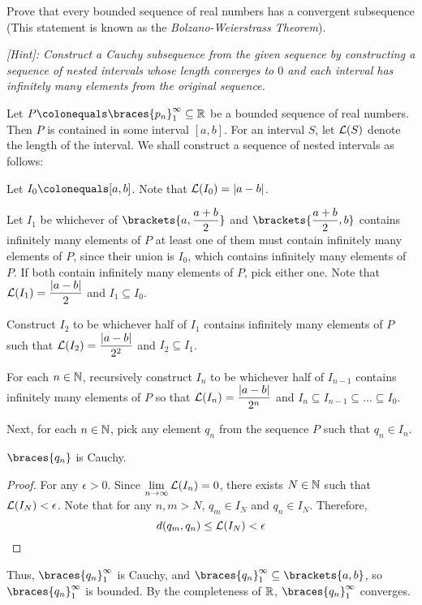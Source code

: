 \begin{problem}
  Prove that every bounded sequence of real numbers has a convergent subsequence
  (This statement is known as the \emph{Bolzano-Weierstrass Theorem}).

  \emph{
    [Hint]: Construct a Cauchy subsequence from the given sequence
    by constructing a sequence of nested intervals whose length converges to $0$
    and each  interval has infinitely many elements from the original sequence.
  }
\end{problem}
\begin{answer}
  Let $P \colonequals \braces{p_n}_1^\infty \subseteq \R$ be a bounded sequence of real numbers.
  Then $P$ is contained in some interval $[a, b]$.
  For an interval $S$, let $\mathcal{L}(S)$ denote the length of the interval.
  We shall construct a sequence of nested intervals as follows:
  \begin{enumarabic}
    \item Let $I_0 \colonequals [a, b]$. Note that $\mathcal{L}(I_0) = \lvert a - b\rvert$.
    \item Let $I_1$ be whichever of
      $\displaystyle \brackets{a, \frac{a+b}{2}}$
      and $\displaystyle \brackets{\frac{a+b}{2}, b}$
      contains infinitely many elements of $P$
      at least one of them must contain infinitely many elements of $P$,
      since their union is $I_0$, which contains infinitely many elements of $P$.
      If both contain infinitely many elements of $P$, pick either one.
      Note that $\displaystyle \mathcal{L}(I_1) = \frac{\lvert a - b\rvert}{2}$ and $I_1 \subseteq I_0$.
    \item Construct $I_2$ to be whichever half of $I_1$
      contains infinitely many elements of $P$
      such that $\displaystyle \mathcal{L}(I_2) = \frac{\lvert a - b\rvert}{2^2}$ and $I_2 \subseteq I_1$.
    \item For each $n \in \mathbb{N}$, recursively construct $I_n$ to be whichever half of $I_{n-1}$
      contains infinitely many elements of $P$
      so that $\displaystyle \mathcal{L}(I_n) = \frac{\lvert a - b\rvert}{2^n}$
      and $I_n \subseteq I_{n-1} \subseteq \ldots \subseteq I_0$.
  \end{enumarabic}
  Next, for each $n \in \mathbb{N}$, pick any element $q_n$ from the sequence $P$
  such that $q_n \in I_n$.

  \begin{claim}
    $\braces{q_n}$ is Cauchy.
    \begin{proof}
      For any $\epsilon > 0$.
      Since $\displaystyle \lim_{n \to \infty}{\mathcal{L}(I_n)} = 0$,
      there exists $N \in \mathbb{N}$ such that $\displaystyle \mathcal{L}(I_N) < \epsilon$.
      Note that for any $n, m > N$, $q_m \in I_N$ and $q_n \in I_N$. Therefore,
      \[ 
        d(q_m, q_n) \leq \mathcal{L}(I_N) < \epsilon
      \]
    \end{proof}
  \end{claim}

  \step
  Thus, $\braces{q_n}_1^\infty$ is Cauchy,
  and $\braces{q_n}_1^\infty \subseteq \brackets{a, b}$,
  so $\braces{q_n}_1^\infty$ is bounded.
  By the completeness of $\mathbb{R}$, $\braces{q_n}_1^\infty$ converges.
\end{answer}
